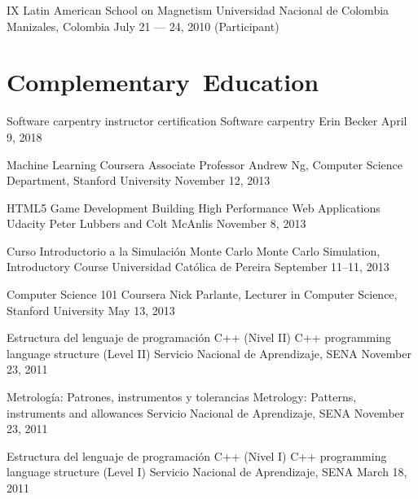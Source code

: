 \documentclass[12pt,english]{moderncv}
\begin{document}
        {IX Latin American School on Magnetism}
        {Universidad Nacional de Colombia}
        {Manizales, Colombia}
        {July 21 --- 24, 2010}
        {(Participant)}


\section{Complementary~Education}

        {Software carpentry instructor certification}
        {}
        {Software carpentry}
        {Erin Becker}
        {April 9, 2018}

        {Machine Learning}
        {}
        {Coursera}
        {Associate Professor Andrew Ng, Computer Science Department, Stanford University}
        {November 12, 2013}

        {HTML5 Game Development}
        {Building High Performance Web Applications}
        {Udacity}
        {Peter Lubbers and Colt McAnlis}
        {November 8, 2013}

        {Curso Introductorio a la Simulación Monte Carlo}
        {Monte Carlo Simulation, Introductory Course}
        {Universidad Católica de Pereira}
        {}
        {September 11--11, 2013}

        {Computer Science 101}
        {}
        {Coursera}
        {Nick Parlante, Lecturer in Computer Science, Stanford University}
        {May 13, 2013}

        {Estructura del lenguaje de programación C++ (Nivel II)}
        {C++ programming language structure (Level II)}
        {Servicio Nacional de Aprendizaje, SENA}
        {}
        {November 23, 2011}

        {Metrología: Patrones, instrumentos y tolerancias}
        {Metrology: Patterns, instruments and allowances}
        {Servicio Nacional de Aprendizaje, SENA}
        {}
        {November 23, 2011}

        {Estructura del lenguaje de programación C++ (Nivel I)}
        {C++ programming language structure (Level I)}
        {Servicio Nacional de Aprendizaje, SENA}
        {}
        {March 18, 2011}
\end{document}
